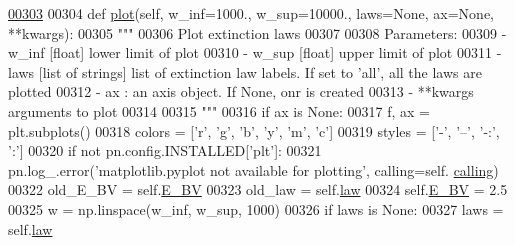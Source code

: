 \begin{DoxyVerb}
\begin{DoxyCode}
\hypertarget{classpyneb_1_1extinction_1_1red__corr_1_1_red_corr_l00303}{}\hyperlink{classpyneb_1_1extinction_1_1red__corr_1_1_red_corr_a95f0d053c5dd67a00f1c1ceefc8da2c0}{00303} 
00304     \textcolor{keyword}{def }\hyperlink{classpyneb_1_1extinction_1_1red__corr_1_1_red_corr_a95f0d053c5dd67a00f1c1ceefc8da2c0}{plot}(self, w\_inf=1000., w\_sup=10000., laws=None, ax=None, **kwargs):
00305         \textcolor{stringliteral}{"""}
00306 \textcolor{stringliteral}{        Plot extinction laws}
00307 \textcolor{stringliteral}{}
00308 \textcolor{stringliteral}{        Parameters:}
00309 \textcolor{stringliteral}{            - w\_inf [float] lower limit of plot}
00310 \textcolor{stringliteral}{            - w\_sup [float] upper limit of plot}
00311 \textcolor{stringliteral}{            - laws [list of strings] list of extinction law labels. If set to 'all', all the laws are
       plotted}
00312 \textcolor{stringliteral}{            - ax : an axis object. If None, onr is created}
00313 \textcolor{stringliteral}{            - **kwargs arguments to plot}
00314 \textcolor{stringliteral}{}
00315 \textcolor{stringliteral}{        """}
00316         \textcolor{keywordflow}{if} ax \textcolor{keywordflow}{is} \textcolor{keywordtype}{None}:
00317             f, ax = plt.subplots()
00318         colors = [\textcolor{stringliteral}{'}\textcolor{stringliteral}{r', '}g', 'b', 'y', 'm', 'c']
00319         styles = [\textcolor{stringliteral}{'-'}, \textcolor{stringliteral}{'--'}, \textcolor{stringliteral}{'-:'}, \textcolor{stringliteral}{':'}]
00320         \textcolor{keywordflow}{if} \textcolor{keywordflow}{not} pn.config.INSTALLED[\textcolor{stringliteral}{'plt'}]:
00321             pn.log\_.error(\textcolor{stringliteral}{'matplotlib.pyplot not available for plotting'}, calling=self.
      \hyperlink{classpyneb_1_1extinction_1_1red__corr_1_1_red_corr_a30606dfd94b4cefefd10dbb1f7cbd473}{calling})
00322         old\_E\_BV = self.\hyperlink{classpyneb_1_1extinction_1_1red__corr_1_1_red_corr_a0bc581bcaa8eeeb67b83ffdec58bf164}{E\_BV}
00323         old\_law = self.\hyperlink{classpyneb_1_1extinction_1_1red__corr_1_1_red_corr_adfed423013315bad4ba5dda2368dc3d0}{law}
00324         self.\hyperlink{classpyneb_1_1extinction_1_1red__corr_1_1_red_corr_a0bc581bcaa8eeeb67b83ffdec58bf164}{E\_BV} = 2.5
00325         w = np.linspace(w\_inf, w\_sup, 1000)
00326         \textcolor{keywordflow}{if} laws \textcolor{keywordflow}{is} \textcolor{keywordtype}{None}:
00327             laws = self.\hyperlink{classpyneb_1_1extinction_1_1red__corr_1_1_red_corr_adfed423013315bad4ba5dda2368dc3d0}{law}

\end{DoxyCode}
\end{DoxyVerb}
